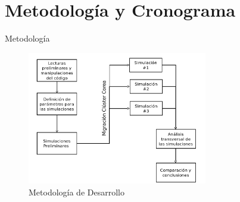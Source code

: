 \documentclass{beamer}
\begin{document}
\section{Metodología y Cronograma}
\begin{frame}{Metodología}
	\begin{figure}
		\centering
		\includegraphics[width=0.7\textwidth]{im/Metodo}
		\caption{Metodología de Desarrollo}
		\label{fig:meto}
	\end{figure}

\end{frame}
\end{document}

